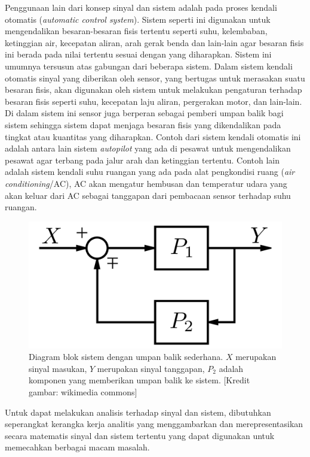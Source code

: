 Penggunaan lain dari konsep sinyal dan sistem adalah pada proses kendali otomatis (\textit{automatic control system}). Sistem seperti ini digunakan untuk mengendalikan besaran-besaran fisis tertentu seperti suhu, kelembaban, ketinggian air, kecepatan aliran, arah gerak benda dan lain-lain agar besaran fisis ini berada pada nilai tertentu sesuai dengan yang diharapkan. Sistem ini umumnya tersusun atas gabungan dari beberapa sistem. Dalam sistem kendali otomatis sinyal yang diberikan oleh sensor, yang bertugas untuk merasakan suatu besaran fisis, akan digunakan oleh sistem untuk melakukan pengaturan terhadap besaran fisis seperti suhu, kecepatan laju aliran, pergerakan motor, dan lain-lain. Di dalam sistem ini sensor juga berperan sebagai pemberi umpan balik bagi sistem sehingga sistem dapat menjaga besaran fisis yang dikendalikan pada tingkat atau kuantitas yang diharapkan. Contoh dari sistem kendali otomatis ini adalah antara lain sistem \textit{autopilot} yang ada di pesawat untuk mengendalikan pesawat agar terbang pada jalur arah dan ketinggian tertentu. Contoh lain adalah sistem kendali suhu ruangan yang ada pada alat pengkondisi ruang (\textit{air conditioning}/AC), AC akan mengatur hembusan dan temperatur udara yang akan keluar dari AC sebagai tanggapan dari pembacaan sensor terhadap suhu ruangan.  

\begin{figure}[!h]
\centering
\includegraphics[scale=0.13]{pict/2000px-Feedback_Loop}
\caption{Diagram blok sistem dengan umpan balik sederhana. $X$ merupakan sinyal masukan, $Y$ merupakan sinyal tanggapan, $P_2$ adalah komponen yang memberikan umpan balik ke sistem. [Kredit gambar: wikimedia commons]}\label{umpanbalik}
\end{figure}

Untuk dapat melakukan analisis terhadap sinyal dan sistem, dibutuhkan seperangkat kerangka kerja analitis yang menggambarkan dan merepresentasikan secara matematis sinyal dan sistem tertentu yang dapat digunakan untuk memecahkan berbagai macam masalah. 
       
